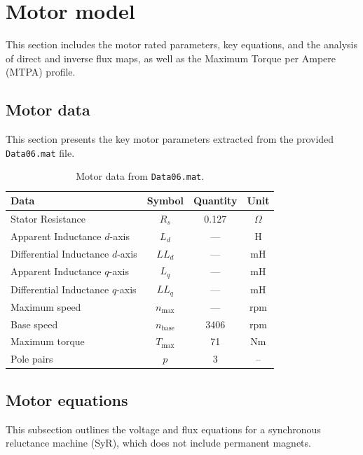 \section{Motor model}
\label{Sect:1}
This section includes the motor rated parameters, key equations, and the analysis of direct and inverse flux maps, as well as the Maximum Torque per Ampere (MTPA) profile.

\subsection{Motor data}
This section presents the key motor parameters extracted from the provided \texttt{Data06.mat} file.

\begin{table}[!h]
    \centering
        \begin{tabular}{@{}lccc@{}} 
        \toprule
        \toprule
        \textbf{Data} & \textbf{Symbol} & \textbf{Quantity} & \textbf{Unit}\\ 
        \midrule
        Stator Resistance      & $R_s$     & 0.127   & $\Omega$ \\
        Apparent Inductance $d$-axis & $L_d$ & ---   & H \\
        Differential Inductance $d$-axis & $LL_d$ & ---   & mH \\
        Apparent Inductance $q$-axis & $L_q$ & ---   & mH \\
        Differential Inductance $q$-axis & $LL_q$ & ---   & mH \\
        Maximum speed          & $n_{\text{max}}$ &---   & rpm \\
        Base speed             & $n_{\text{base}}$ & 3406    & rpm \\
        Maximum torque         & $T_{\max}$ & 71     & Nm \\
        Pole pairs             & $p$       & 3       & -- \\
        \bottomrule
        \end{tabular}
    \captionsetup{justification=justified}
    \caption{Motor data from \texttt{Data06.mat}.}
    \label{tab:Motor_data}
\end{table}

\subsection{Motor equations}
This subsection outlines the voltage and flux equations for a synchronous reluctance machine (SyR), which does not include permanent magnets.

